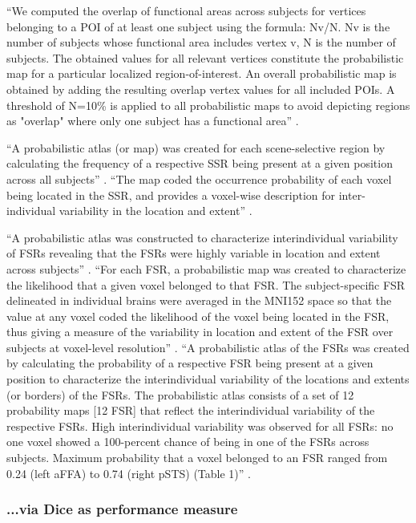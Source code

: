 %
``We computed the overlap of functional areas across subjects for vertices
belonging to a POI of at least one subject using the formula: Nv/N.
%
Nv is the number of subjects whose functional area includes vertex v,
%
N is the number of subjects.
%
The obtained values for all relevant vertices constitute the probabilistic map
for a particular localized region-of-interest.
%
An overall probabilistic map is obtained by adding the resulting overlap vertex
values for all included POIs.
%
A threshold of N=10\% is applied to all probabilistic maps to avoid depicting
regions as "overlap" where only one subject has a functional area''
\citep{frost2012measuring}.


%
``A probabilistic atlas (or map) was created for each scene-selective region by
calculating the frequency of a respective SSR being present at a given position
across all subjects'' \citep{zhen2017quantifying}.
%
``The map coded the occurrence probability of each voxel being located in the
SSR, and provides a voxel-wise description for inter-individual variability in
the location and extent'' \citep{zhen2017quantifying}.


%
``A probabilistic atlas was constructed to characterize interindividual
variability of FSRs revealing that the FSRs were highly variable in location and
extent across subjects'' \citep{zhen2015quantifying}.
%
``For each FSR, a probabilistic map was created to characterize the likelihood
that a given voxel belonged to that FSR.
%
The subject-specific FSR delineated in individual brains were averaged in the
MNI152 space so that the value at any voxel coded the likelihood of the voxel
being located in the FSR, thus giving a measure of the variability in location
and extent of the FSR over subjects at voxel-level resolution''
\citep{zhen2015quantifying}.
%
``A probabilistic atlas of the FSRs was created by calculating the probability
of a respective FSR being present at a given position to characterize the
interindividual variability of the locations and extents (or borders) of the
FSRs.
%
The probabilistic atlas consists of a set of 12 probability maps [12 FSR] that
reflect the interindividual variability of the respective FSRs.
%
High interindividual variability was observed for all FSRs: no one voxel showed
a 100-percent chance of being in one of the FSRs across subjects.
%
Maximum probability that a voxel belonged to an FSR ranged from 0.24 (left aFFA)
to 0.74 (right pSTS) (Table 1)'' \citet{zhen2015quantifying}.


\subsubsection{...via Dice as performance measure}

